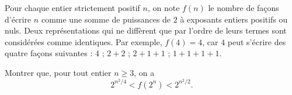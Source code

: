 Pour chaque entier strictement positif $n$, on note $f(n)$ le nombre de façons d'écrire $n$ comme une somme de puissances de $2$ à exposants entiers positifs ou nuls. Deux représentations qui ne diffèrent que par l'ordre de leurs termes sont considérées comme identiques. Par exemple, $f(4) = 4$, car $4$ peut s'écrire des quatre façons suivantes : $4$ ; $2+2$ ; $2+1+1$ ; $1+1+1+1$.

Montrer que, pour tout entier $n \ge 3$, on a
\[ 2^{n^2/4} < f(2^n) < 2^{n^2/2}. \]
